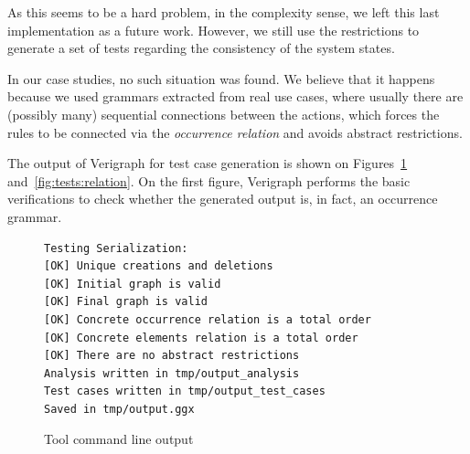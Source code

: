 As this seems to be a hard problem, in the complexity sense, we left this last implementation as a future work. However, we still use the restrictions to generate a set of tests regarding the consistency of the system states.

In our case studies, no such situation was found. We believe that it happens because we used grammars extracted from real use cases, where usually there are (possibly many) sequential connections between the actions, which forces the rules to be connected via the \emph{occurrence relation} and avoids abstract restrictions.

The output of Verigraph for test case generation is shown on Figures~\ref{fig:tests:checklist} and~\ref{fig:tests:relation}. On the first figure, Verigraph performs the basic verifications to check whether the generated output is, in fact, an occurrence grammar.

\begin{figure}[!ht]
\caption{Tool command line output}
\begin{verbatim}
Testing Serialization:
[OK] Unique creations and deletions
[OK] Initial graph is valid
[OK] Final graph is valid
[OK] Concrete occurrence relation is a total order
[OK] Concrete elements relation is a total order
[OK] There are no abstract restrictions
Analysis written in tmp/output_analysis
Test cases written in tmp/output_test_cases
Saved in tmp/output.ggx
\end{verbatim}
  \label{fig:tests:checklist}
\end{figure}

